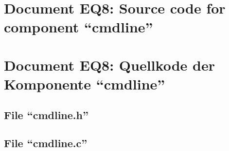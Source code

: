 \parindent0pt
\pagestyle{myheadings}
\ifenglish
{}
\fi
\ifgerman
{}
\fi

\ifenglish
\section*{Document EQ8: Source code for component ``cmdline''}
\fi
\ifgerman
\section*{Document EQ8: Quellkode der Komponente "`cmdline"'}
\fi

\subsection*{File ``cmdline.h''}
\smallskip

\newpage

\subsection*{File ``cmdline.c''}
\smallskip




